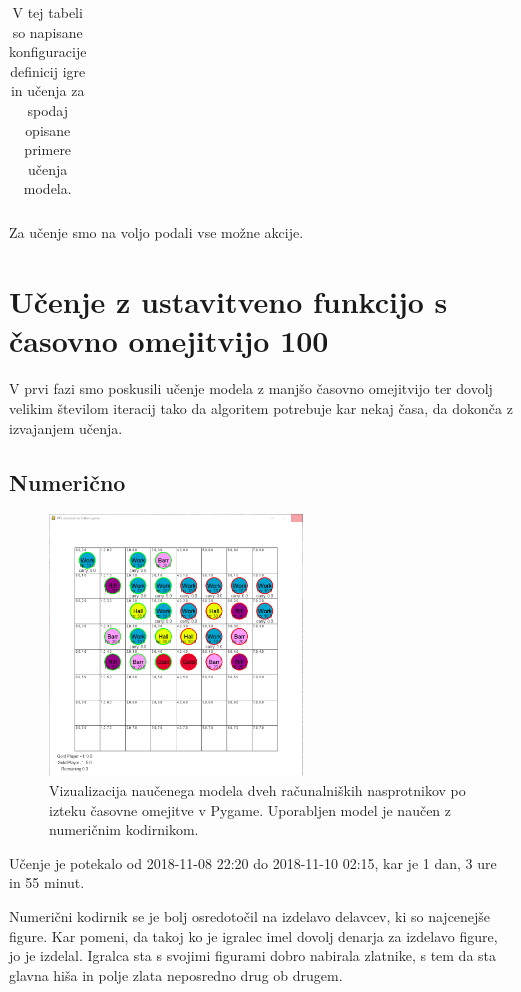 \documentclass[a4paper, 12pt]{book}
\begin{document}
\begin{table}
\begin{center}
\begin{tabular}{p{0.4\linewidth}|p{0.1\linewidth}|p{0.1\linewidth}|p{0.1\linewidth}|p{0.1\linewidth}}
		\end{tabular}
	\end{center}
	\caption{V tej tabeli so napisane konfiguracije definicij igre in učenja za spodaj opisane primere učenja modela.}
	\label{tabelLearnConfig}
\end{table}

Za učenje smo na voljo podali vse možne akcije.

\section{Učenje z ustavitveno funkcijo s časovno omejitvijo 100}
\label{resultFirst}
V prvi fazi smo poskusili učenje modela z manjšo časovno omejitvijo ter dovolj velikim številom iteracij tako da algoritem potrebuje kar nekaj časa, da dokonča z izvajanjem učenja.


\subsection{Numerično}

\begin{figure}[h]
	\begin{center}
		\includegraphics[width=0.6\textwidth]{first-numeric.pdf}
	\end{center}
	\caption{Vizualizacija naučenega modela dveh računalniških nasprotnikov po izteku časovne omejitve v Pygame. Uporabljen model je naučen z numeričnim kodirnikom.}
	\label{vizualizacijaRezultatovNumericniKodirnik100Timeout}
\end{figure}

Učenje je potekalo od 2018-11-08 22:20 do 2018-11-10 02:15, kar je 1 dan, 3 ure in 55 minut.


Numerični kodirnik se je bolj osredotočil na izdelavo delavcev, ki so najcenejše figure. Kar pomeni, da takoj ko je igralec imel dovolj denarja za izdelavo figure, jo je izdelal.
Igralca sta s svojimi figurami dobro nabirala zlatnike, s tem da sta glavna hiša in polje zlata neposredno drug ob drugem.
\end{document}
